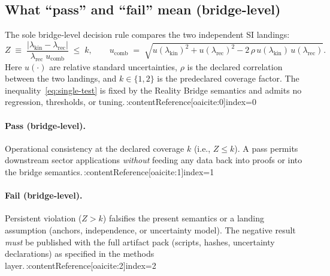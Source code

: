 \documentclass[11pt]{article}
\begin{document}
\subsection{What “pass” and “fail” mean (bridge‑level)}
The sole bridge‑level decision rule compares the two independent SI landings:
\begin{equation}\label{eq:single-test}
  Z \;\equiv\; 
  \frac{\bigl|\lambda_{\mathrm{kin}}-\lambda_{\mathrm{rec}}\bigr|}
       {\lambda_{\mathrm{rec}}\;u_{\mathrm{comb}}}
  \;\le\; k,
  \qquad
  u_{\mathrm{comb}}
  \;=\;
  \sqrt{u(\lambda_{\mathrm{kin}})^{2}+u(\lambda_{\mathrm{rec}})^{2}
        -2\,\rho\,u(\lambda_{\mathrm{kin}})\,u(\lambda_{\mathrm{rec}})}.
\end{equation}
Here $u(\cdot)$ are relative standard uncertainties, $\rho$ is the declared correlation between the two landings, and $k\in\{1,2\}$ is the predeclared coverage factor. The inequality~\eqref{eq:single-test} is fixed by the Reality Bridge semantics and admits no regression, thresholds, or tuning.\,:contentReference[oaicite:0]{index=0}

\paragraph{Pass (bridge‑level).}
Operational consistency at the declared coverage $k$ (i.e., $Z\le k$). A pass permits downstream sector applications \emph{without} feeding any data back into proofs or into the bridge semantics.\,:contentReference[oaicite:1]{index=1}

\paragraph{Fail (bridge‑level).}
Persistent violation ($Z>k$) falsifies the present semantics or a landing assumption (anchors, independence, or uncertainty model). The negative result \emph{must} be published with the full artifact pack (scripts, hashes, uncertainty declarations) as specified in the methods layer.\,:contentReference[oaicite:2]{index=2}
\end{document}
